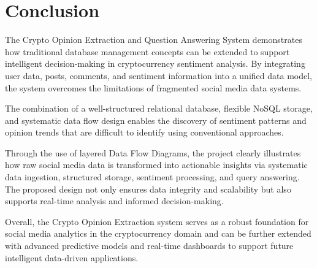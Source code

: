 
\chapter{Conclusion}

The Crypto Opinion Extraction and Question Answering System demonstrates how traditional database management concepts can be extended to support intelligent decision-making in cryptocurrency sentiment analysis. By integrating user data, posts, comments, and sentiment information into a unified data model, the system overcomes the limitations of fragmented social media data systems.

The combination of a well-structured relational database, flexible NoSQL storage, and systematic data flow design enables the discovery of sentiment patterns and opinion trends that are difficult to identify using conventional approaches.

Through the use of layered Data Flow Diagrams, the project clearly illustrates how raw social media data is transformed into actionable insights via systematic data ingestion, structured storage, sentiment processing, and query answering. The proposed design not only ensures data integrity and scalability but also supports real-time analysis and informed decision-making.

Overall, the Crypto Opinion Extraction system serves as a robust foundation for social media analytics in the cryptocurrency domain and can be further extended with advanced predictive models and real-time dashboards to support future intelligent data-driven applications.
